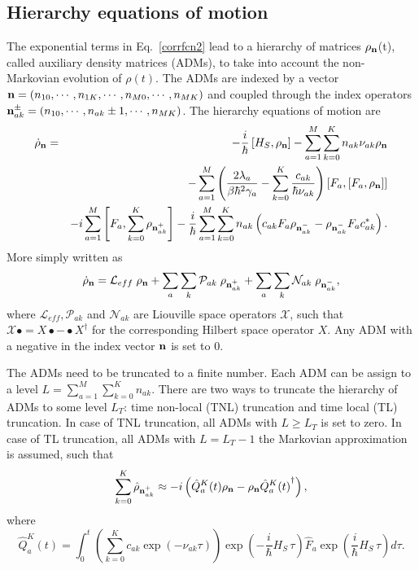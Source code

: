 \documentclass[11pt]{article}
\begin{document}
\subsection{Hierarchy equations of motion}
The exponential terms in Eq.~\ref{corrfcn2} lead to a hierarchy of matrices $\rho_{\bf n}$(t), called auxiliary density matrices (ADMs), to take into account the non-Markovian evolution of $\rho(t)$. The ADMs are indexed by a vector ${\bf n}=\left(n_{10},\cdots,n_{1K},\cdots,n_{M0},\cdots,n_{MK}\right)$ and coupled through the index operators ${\bf n}_{ak}^{\pm} = \left(n_{10},\cdots,n_{ak}\pm 1,\cdots,n_{MK}\right)$. The hierarchy equations of motion are
\begin{eqnarray}
\dot {\rho}_{\bf n} &=& -\frac i \hbar \left[ H_S, \rho_{\bf n}\right]-\sum_{a=1}^M\sum_{k=0}^K n_{ak}\nu_{ak} \rho_{\bf n}\\
    &&-\sum_{a=1}^M\left(\frac{2\lambda_a}{\beta\hbar^2\gamma_a}-\sum_{k=0}^K \frac{c_{ak}}{\hbar\nu_{ak}}\right)\left[ F_a,\left[  F_a, \rho_{\bf n}\right]\right]\\
    &&-i\sum_{a=1}^M\left[ F_a,\sum_{k=0}^K \rho_{{\bf n}_{ak}^+}\right]  -\frac{i}{\hbar}\sum_{a=1}^M\sum_{k=0}^K n_{ak} \left(c_{ak}  F_a  \rho_{{\bf n}_{ak}^-} -  \rho_{{\bf n}_{ak}^-}  F_a c_{ak}^*\right).
\label{eqn:HEOM}
\end{eqnarray}
More simply written as 
\begin{equation}
\dot {\rho}_{\bf n} = \mathcal{L}_{eff}\;{\rho}_{\bf n} + \sum_{a}\sum_{k}\mathcal{P}_{ak}\;{\rho}_{{\bf n}_{ak}^+} + \sum_{a}\sum_{k}\mathcal{N}_{ak}\;{\rho}_{{\bf n}_{ak}^-},
\end{equation}
where $\mathcal{L}_{eff},\mathcal{P}_{ak}$ and $\mathcal{N}_{ak}$ are Liouville space operators $\mathcal{X}$, such that $\mathcal{X} \bullet = X\bullet - \bullet X^\dag$ for the corresponding Hilbert space operator $X$. Any ADM with a negative in the index vector ${\bf n}$ is set to 0.  

The ADMs need to be truncated to a finite number. Each ADM can be assign to a level $L = \sum_{a=1}^M\sum_{k=0}^K n_{ak}$. There are two ways to truncate the hierarchy of ADMs to some level $L_T$: time non-local (TNL) truncation and time local (TL) truncation. In case of TNL truncation, all ADMs with $L \ge L_T$ is set to zero. In case of TL truncation, all ADMs with $L=L_T-1$ the Markovian approximation is assumed, such that
\begin{equation}
\sum_{k=0}^K\hat \rho_{{\bf n}_{ak}^+} \approx -i \left( \hat Q_a^K(t) \rho_{\bf n} - \rho_{\bf n} {\hat Q_a^K(t)}^\dag\right),
\end{equation}
where
\begin{equation}
\hat Q_a^K(t) = \int_0^t \left(\sum_{k=0}^K c_{ak} \exp\left(-\nu_{ak} \tau\right)\right)\exp\left(-\frac{i}{\hbar}H_S\,\tau\right)\hat F_a \exp\left(\frac{i}
{\hbar}H_S\,\tau\right)d\tau.
\end{equation}
\end{document}
